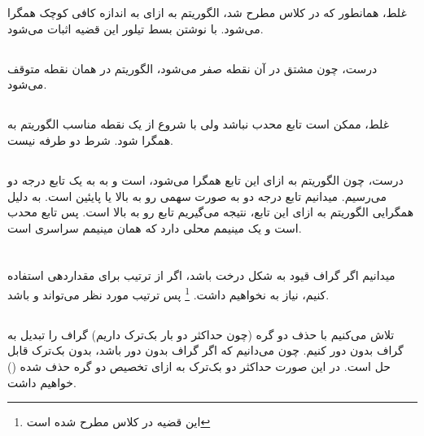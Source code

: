 \documentclass{university}
\begin{document}
\setupdocument

\section{}
\subsection{}
غلط، همانطور که در کلاس مطرح شد، الگوریتم به ازای 
\lr{$\epsilon$} 
به اندازه کافی کوچک همگرا می‌شود. با نوشتن بسط تیلور این قضیه اثبات می‌شود. 

\subsection{}
درست، چون مشتق در آن نقطه صفر می‌شود، الگوریتم در همان نقطه متوقف می‌شود. 

\subsection{}
غلط، ممکن است تابع محدب نباشد ولی با شروع از یک نقطه مناسب الگوریتم به 
همگرا شود. شرط دو طرفه نیست. 

\subsection{}
درست، چون الگوریتم به ازای این تابع همگرا می‌شود،  
است و به به یک تابع درجه دو می‌رسیم. میدانیم تابع درجه دو به صورت سهمی رو به بالا یا پایئین است. 
به دلیل همگرایی الگوریتم به ازای این تابع، نتیجه می‌گیریم تابع رو به بالا است. پس تابع 
محدب است و یک مینیمم محلی دارد که همان مینیمم سراسری است. 

\section{}
\subsection{}
میدانیم اگر گراف قیود به شکل درخت باشد، اگر از ترتیب 
برای مقداردهی استفاده کنیم، نیاز به 
نخواهیم داشت. 
\footnote{این قضیه در کلاس مطرح شده است}
پس ترتیب مورد نظر ‌می‌تواند 
و
باشد. 

\subsection{}
تلاش می‌کنیم با حذف دو گره (چون حداکثر دو بار بک‌ترک داریم) گراف را تبدیل به گراف بدون دور کنیم. 
چون می‌دانیم که اگر گراف بدون دور باشد، بدون بک‌ترک قابل حل است. در این صورت حداکثر دو 
بک‌ترک به ازای تخصیص دو گره حذف شده 
()
خواهیم داشت. 
\end{document}
